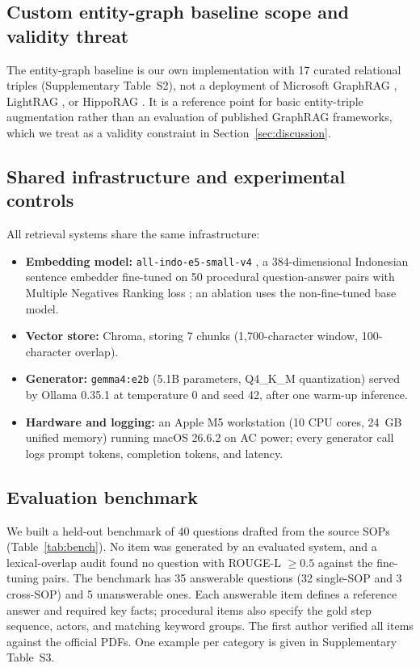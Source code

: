 \documentclass[preprint,10pt]{elsarticle}
\begin{document}
\subsection{Custom entity-graph baseline scope and validity threat}
The entity-graph baseline is our own implementation with 17 curated relational triples (Supplementary Table~S2), not a deployment of Microsoft GraphRAG \cite{edge2024graphrag}, LightRAG \cite{guo2024lightrag}, or HippoRAG \cite{gutierrez2024hipporag}. It is a reference point for basic entity-triple augmentation rather than an evaluation of published GraphRAG frameworks, which we treat as a validity constraint in Section~\ref{sec:discussion}.

\subsection{Shared infrastructure and experimental controls}
All retrieval systems share the same infrastructure:
\begin{itemize}[leftmargin=*]
\item \textbf{Embedding model:} \texttt{all-indo-e5-small-v4} \cite{lazarusnlp_e5}, a 384-dimensional Indonesian sentence embedder fine-tuned on 50 procedural question-answer pairs with Multiple Negatives Ranking loss \cite{henderson2017mnr}; an ablation uses the non-fine-tuned base model.
\item \textbf{Vector store:} Chroma, storing 7 chunks (1,700-character window, 100-character overlap).
\item \textbf{Generator:} \texttt{gemma4:e2b} (5.1B parameters, Q4\_K\_M quantization) served by Ollama 0.35.1 at temperature 0 and seed 42, after one warm-up inference.
\item \textbf{Hardware and logging:} an Apple M5 workstation (10 CPU cores, 24~GB unified memory) running macOS 26.6.2 on AC power; every generator call logs prompt tokens, completion tokens, and latency.
\end{itemize}

\subsection{Evaluation benchmark}
We built a held-out benchmark of 40 questions drafted from the source SOPs (Table~\ref{tab:bench}). No item was generated by an evaluated system, and a lexical-overlap audit found no question with ROUGE-L $\geq 0.5$ against the fine-tuning pairs. The benchmark has 35 answerable questions (32 single-SOP and 3 cross-SOP) and 5 unanswerable ones. Each answerable item defines a reference answer and required key facts; procedural items also specify the gold step sequence, actors, and matching keyword groups. The first author verified all items against the official PDFs. One example per category is given in Supplementary Table~S3.
\end{document}
